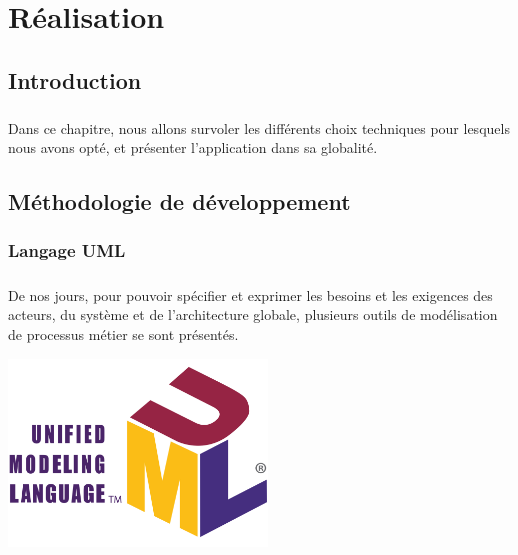 \chapter{Réalisation}

\section*{Introduction}
{}

\paragraph{}\begin{spacing}{2}
Dans ce chapitre, nous allons survoler les différents choix techniques pour lesquels nous avons opté, et présenter l’application dans sa globalité.
\end{spacing}
\vspace{4cm} 

\newpage
\section{Méthodologie de développement}
\subsection{Langage UML}
\paragraph{}
De nos jours, pour pouvoir spécifier et exprimer les besoins et les exigences des acteurs, du système et de l’architecture globale, plusieurs outils de modélisation de processus métier se sont présentés.

\begin{minipage}{1\textwidth}
		\centering
		\includegraphics[width=\linewidth, height=5cm]{images/UML_logo.svg.png}
\end{minipage}
